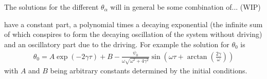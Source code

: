 \documentclass[12pt,a4paper]{article}
\begin{document}
The solutions for the different $\theta_{\alpha}$ will in general be some combination of... (WIP)


have a constant part, a polynomial times a decaying exponential (the infinite sum of which conspires to form the decaying oscillation of the system without driving) and an oscillatory part due to the driving. For example the solution for $\theta_0$ is
%
\begin{align}
\theta_0 = A \exp(-2\gamma \tau) + B - \frac{\psi_0}{\omega \sqrt{\omega^2 + 4\gamma^2}}\sin\left(\omega \tau + \arctan\left(\frac{2\gamma}{\omega}\right)\right)
\end{align}
%
with $A$ and $B$ being arbitrary constants determined by the initial conditions.
\end{document}
